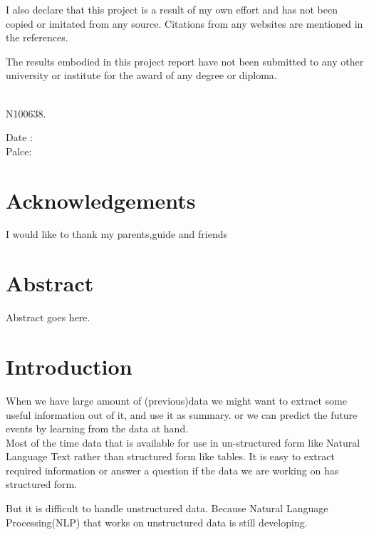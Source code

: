 \documentclass[12pt]{report}
\newcommand*{\Signature}[1]{
	\vspace{3cm}
    \par\noindent\makebox[5cm]{\hrulefill}
    \par\noindent\makebox[5cm][l]{#1}
}
\begin{document}
\par I also declare that this project is a result of my own effort and has not been copied or imitated from any source.
 Citations from any websites are mentioned in the references.
\par The results embodied in this project report have not been submitted to any other university or institute for the award of any degree or diploma.

\Signature{N. SAI KIRAN,}\\N100638.\\
\begin{flushright}
Date : \makebox[3cm]{\hrulefill}\\
Palce: \makebox[3cm]{\hrulefill}\\
\end{flushright}
\pagebreak

\chapter*{Acknowledgements}
\par I would like to thank my parents,guide and friends
\chapter*{Abstract}

\par Abstract goes here.

\pagestyle{empty} %
\tableofcontents %
\cleardoublepage %
\pagestyle{plain} %
\setcounter{page}{1} %

\chapter{Introduction}
When we have large amount of (previous)data we might want to extract some useful information
 out of it, and use it as summary. or we can predict the future events by learning from the
 data at hand.\\
Most of the time data that is available for use in un-structured form like Natural Language Text
rather than structured form like tables. It is easy to extract required information or 
answer a question if the data we are working on has structured form.

But it is difficult to handle unstructured data. Because Natural Language Processing(NLP)
that works on unstructured data is still developing.
\end{document}
